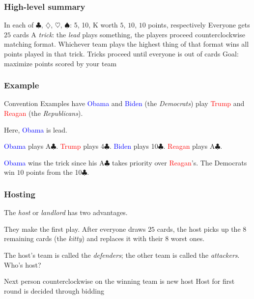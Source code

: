 \documentclass{beamer}
\renewcommand{\c}{$\clubsuit$}
\renewcommand{\d}{$\diamondsuit$}
\newcommand{\h}{$\heartsuit$}
\newcommand{\s}{$\spadesuit$}
\begin{document}
\begin{frame}
	\frametitle{High-level summary}
	\begin{itemize}
		\ii In each of \c, \d, \h, \s{}: 5, 10, K worth $5$, $10$, $10$ points, respectively
		\ii Everyone gets $25$ cards
		\ii A \emph{trick}: the \emph{lead} plays something, the players proceed counterclockwise \alert{matching format}. Whichever team plays the highest thing of that format wins all points played in that trick.
		\ii Tricks proceed until everyone is out of cards
		\ii Goal: maximize points scored by your team

	\end{itemize}
\end{frame}

\begin{frame}
	\frametitle{Example}
	\begin{block}{Convention}
		Examples have \textcolor{blue}{Obama} and \textcolor{blue}{Biden} (the \emph{Democrats}) play \textcolor{red}{Trump} and \textcolor{red}{Reagan} (the \emph{Republicans}).
	\end{block}
	
	Here, \textcolor{blue}{Obama} is lead.
	\begin{itemize}
		\ii \textcolor{blue}{Obama} plays A\c.
		\ii \textcolor{red}{Trump} plays 4\c.
		\ii \textcolor{blue}{Biden} plays 10\c.
		\ii \textcolor{red}{Reagan} plays A\c.
	\end{itemize}
	\textcolor{blue}{Obama} wins the trick since his A\c{} takes priority over \textcolor{red}{Reagan}'s. The Democrats win $10$ points from the 10\c.
	
	\note{i'll explain the card orders later}
\end{frame}

\begin{frame}
	\frametitle{Hosting}
	The \emph{host} or \emph{landlord} has two advantages.
	\begin{itemize}
		\ii They make the first play.
		\ii After everyone draws $25$ cards, the host picks up the $8$ remaining cards (the \emph{kitty}) and replaces it with their $8$ worst ones.
	\end{itemize}

	The host's team is called the \emph{defenders}; the other team is called the \emph{attackers}. Who's host?
	\begin{itemize}
		\ii Next person counterclockwise on the winning team is new host
		\ii Host for first round is decided through bidding
	\end{itemize}
\end{frame}
\end{document}
